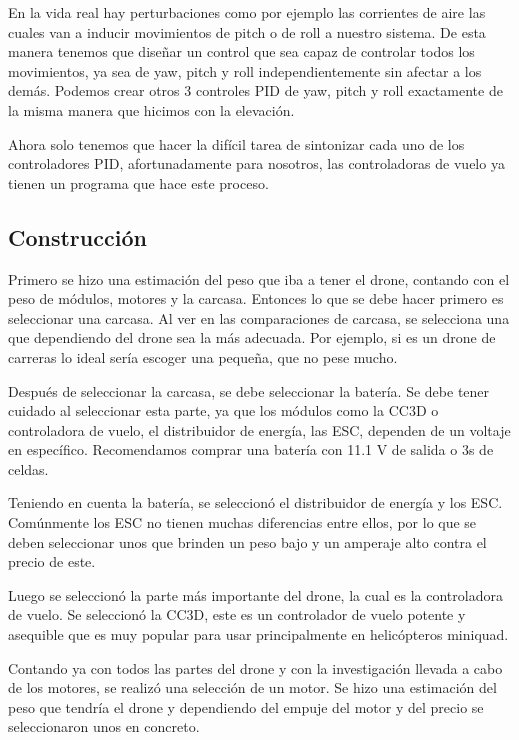 \documentclass[pdflatex,sn-mathphys-num]{sn-jnl}%
\begin{document}
En la vida real hay perturbaciones como por ejemplo las corrientes de aire las cuales van a inducir movimientos de pitch o de roll a nuestro sistema. De esta manera tenemos que diseñar un control que sea capaz de controlar todos los movimientos, ya sea de yaw, pitch y roll independientemente sin afectar a los demás. Podemos crear otros 3 controles PID de yaw, pitch y roll exactamente de la misma manera que hicimos con la elevación.

Ahora solo tenemos que hacer la difícil tarea de sintonizar cada uno de los controladores PID, afortunadamente para nosotros, las controladoras de vuelo ya tienen un programa que hace este proceso.

\subsection{Construcción}

Primero se hizo una estimación del peso que iba a tener el drone, contando con el peso de módulos, motores y la carcasa. Entonces lo que se debe hacer primero es seleccionar una carcasa. Al ver en las comparaciones de carcasa, se selecciona una que dependiendo del drone sea la más adecuada. Por ejemplo, si es un drone de carreras lo ideal sería escoger una pequeña, que no pese mucho.

Después de seleccionar la carcasa, se debe seleccionar la batería. Se debe tener cuidado al seleccionar esta parte, ya que los módulos como la CC3D o controladora de vuelo, el distribuidor de energía, las ESC, dependen de un voltaje en específico. Recomendamos comprar una batería con 11.1 V de salida o 3s de celdas.

Teniendo en cuenta la batería, se seleccionó el distribuidor de energía y los ESC. Comúnmente los ESC no tienen muchas diferencias entre ellos, por lo que se deben seleccionar unos que brinden un peso bajo y un amperaje alto contra el precio de este.

Luego se seleccionó la parte más importante del drone, la cual es la controladora de vuelo. Se seleccionó la CC3D, este es un controlador de vuelo potente y asequible que es muy popular para usar principalmente en helicópteros miniquad.

Contando ya con todos las partes del drone y con la investigación llevada a cabo de los motores, se realizó una selección de un motor. Se hizo una estimación del peso que tendría el drone y dependiendo del empuje del motor y del precio se seleccionaron unos en concreto.
\end{document}

